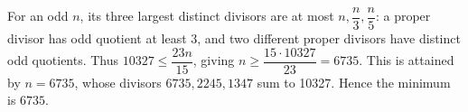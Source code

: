 For an odd $n$, its three largest distinct divisors are at most $n,\dfrac{n}{3},\dfrac{n}{5}$: a proper divisor has odd quotient at least 3, and two different proper divisors have distinct odd quotients. Thus $10327\le\dfrac{23n}{15}$, giving $n\ge\dfrac{15\cdot10327}{23}=6735$. This is attained by $n=6735$, whose divisors $6735,2245,1347$ sum to 10327. Hence the minimum is $\boxed{6735}$.
